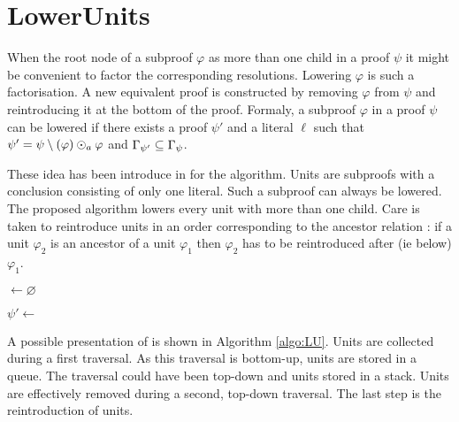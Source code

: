 \documentclass{llncs}
\begin{document}
\section{LowerUnits} \label{sec:LU}

When the root node of a subproof $\varphi$ as more than one child in a proof $\psi$ it might be
convenient to factor the corresponding resolutions. Lowering $\varphi$ is such a factorisation. A
new equivalent proof is constructed by removing $\varphi$ from $\psi$ and reintroducing it at the
bottom of the proof. Formaly, a subproof $\varphi$ in a proof $\psi$ can be lowered if there exists
a proof $\psi'$ and a literal $\ell$ such that $\psi' = \psi \setminus (\varphi) \odot_a \varphi$ and
$\Gamma_{\psi'} \subseteq \Gamma_{\psi}$.

These idea has been introduce in \cite{LURPI} for the {\LowerUnits} algorithm. Units are subproofs
with a conclusion consisting of only one literal. Such a subproof can always be lowered. The
proposed algorithm lowers every unit with more than one child. Care is taken to reintroduce units in
an order corresponding to the ancestor relation : if a unit $\varphi_2$ is an ancestor of a unit
$\varphi_1$ then $\varphi_2$ has to be reintroduced after (ie below) $\varphi_1$.

\begin{algorithm}[bt]
  \BlankLine

  \Units $\leftarrow \varnothing$ \;
  \BlankLine

  \BlankLine

  $\psi' \leftarrow $ \Rec{$\psi$,$\Units$} \;
  \BlankLine


  \caption{\LowerUnits}
  \label{algo:LU}
\end{algorithm}

A possible presentation of {\LowerUnits} is shown in Algorithm \ref{algo:LU}. Units are collected
during a first traversal. As this traversal is bottom-up, units are stored in a queue. The traversal
could have been top-down and units stored in a stack. Units are effectively removed during a second,
top-down traversal. The last step is the reintroduction of units.
\end{document}
